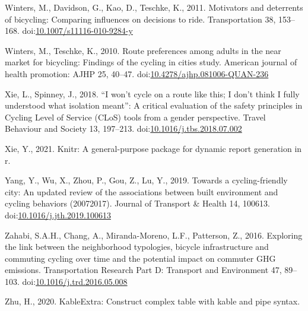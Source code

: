 \documentclass[]{elsarticle} %
\begin{document}
\leavevmode\hypertarget{ref-wintersMotivatorsDeterrentsBicycling2011}{}%
Winters, M., Davidson, G., Kao, D., Teschke, K., 2011. Motivators and
deterrents of bicycling: Comparing influences on decisions to ride.
Transportation 38, 153--168.
doi:\href{https://doi.org/10.1007/s11116-010-9284-y}{10.1007/s11116-010-9284-y}

\leavevmode\hypertarget{ref-wintersRoutePreferencesAdults2010}{}%
Winters, M., Teschke, K., 2010. Route preferences among adults in the
near market for bicycling: Findings of the cycling in cities study.
American journal of health promotion: AJHP 25, 40--47.
doi:\href{https://doi.org/10.4278/ajhp.081006-QUAN-236}{10.4278/ajhp.081006-QUAN-236}

\leavevmode\hypertarget{ref-xieWonCycleRoute2018}{}%
Xie, L., Spinney, J., 2018. ``I won't cycle on a route like this; I
don't think I fully understood what isolation meant'': A critical
evaluation of the safety principles in Cycling Level of Service (CLoS)
tools from a gender perspective. Travel Behaviour and Society 13,
197--213.
doi:\href{https://doi.org/10.1016/j.tbs.2018.07.002}{10.1016/j.tbs.2018.07.002}

\leavevmode\hypertarget{ref-R-knitr}{}%
Xie, Y., 2021. Knitr: A general-purpose package for dynamic report
generation in r.

\leavevmode\hypertarget{ref-yangCyclingfriendlyCityUpdated2019}{}%
Yang, Y., Wu, X., Zhou, P., Gou, Z., Lu, Y., 2019. Towards a
cycling-friendly city: An updated review of the associations between
built environment and cycling behaviors (20072017). Journal of Transport
\& Health 14, 100613.
doi:\href{https://doi.org/10.1016/j.jth.2019.100613}{10.1016/j.jth.2019.100613}

\leavevmode\hypertarget{ref-zahabiExploringLinkNeighborhood2016b}{}%
Zahabi, S.A.H., Chang, A., Miranda-Moreno, L.F., Patterson, Z., 2016.
Exploring the link between the neighborhood typologies, bicycle
infrastructure and commuting cycling over time and the potential impact
on commuter GHG emissions. Transportation Research Part D: Transport and
Environment 47, 89--103.
doi:\href{https://doi.org/10.1016/j.trd.2016.05.008}{10.1016/j.trd.2016.05.008}

\leavevmode\hypertarget{ref-R-kableExtra}{}%
Zhu, H., 2020. KableExtra: Construct complex table with kable and pipe
syntax.
\end{document}
